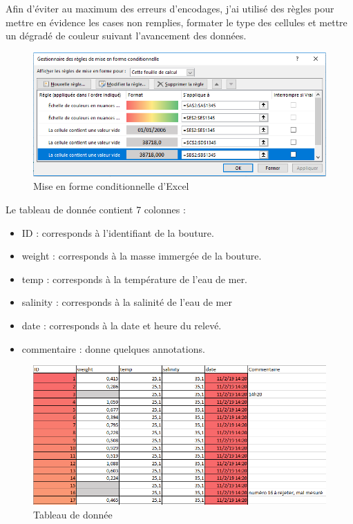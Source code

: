 \documentclass[]{report}
\begin{document}
Afin d'éviter au maximum des erreurs d'encodages, j'ai utilisé des
règles pour mettre en évidence les cases non remplies, formater le type
des cellules et mettre un dégradé de couleur suivant l'avancement des
données.

\begin{figure}[h!]
\includegraphics[]{../image/excel3.PNG}
\caption{Mise en forme conditionnelle d'Excel}
\end{figure}

Le tableau de donnée contient 7 colonnes :

\begin{itemize}
\item
  ID : corresponds à l'identifiant de la bouture.
\item
  weight : corresponds à la masse immergée de la bouture.
\item
  temp : corresponds à la température de l'eau de mer.
\item
  salinity : corresponds à la salinité de l'eau de mer
\item
  date : corresponds à la date et heure du relevé.
\item
  commentaire : donne quelques annotations.
\end{itemize}

\begin{figure}[h!]
\includegraphics[]{../image/excel1.PNG}
\caption{Tableau de donnée}
\end{figure}
\end{document}
